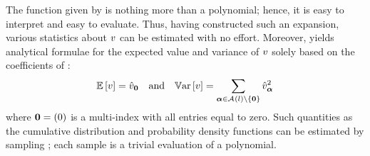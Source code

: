 The function given by  is nothing more than a polynomial; hence, it is easy to interpret and easy to evaluate.
Thus, having constructed such an expansion, various statistics about $v$ can be estimated with no effort.
Moreover,  yields analytical formulae for the expected value and variance of $v$ solely based on the coefficients of :
\begin{equation} \elab{probabilistic-moments}
  \expectation{\w} = \coefficient{\w}_\vZero \hspace{1em} \text{and} \hspace{1em} \variance{\w} = \sum_{\multiindex \in \multiindexSet{\level} \setminus \{ \vZero \}} \coefficient{\w}_{\multiindex}^2
\end{equation}
where $\mathbf{0} = (0)$ is a multi-index with all entries equal to zero.
Such quantities as the cumulative distribution and probability density functions can be estimated by sampling ; each sample is a trivial evaluation of a polynomial.

